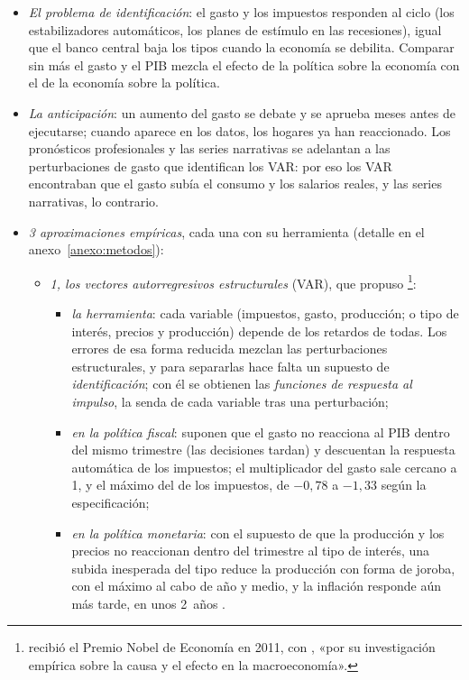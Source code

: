 \documentclass[11pt]{article}
\begin{document}
\begin{itemize}
\item \emph{El problema de identificación}: el gasto y los impuestos responden al ciclo (los estabilizadores automáticos, los planes de estímulo en las recesiones), igual que el banco central baja los tipos cuando la economía se debilita. Comparar sin más el gasto y el PIB mezcla el efecto de la política sobre la economía con el de la economía sobre la política.
\item \emph{La anticipación}: un aumento del gasto se debate y se aprueba meses antes de ejecutarse; cuando aparece en los datos, los hogares ya han reaccionado. Los pronósticos profesionales y las series narrativas se adelantan a las perturbaciones de gasto que identifican los VAR\nocite{Ramey2011Timing}: por eso los VAR encontraban que el gasto subía el consumo y los salarios reales, y las series narrativas, lo contrario.
\item \emph{3 aproximaciones empíricas}, cada una con su herramienta (detalle en el anexo~\ref{anexo:metodos}):
  \begin{itemize}
  \item \emph{1, los vectores autorregresivos estructurales} (VAR), que propuso \textcite{Sims1980Macroeconomics}\footnote{ recibió el Premio Nobel de Economía en 2011, con , «por su investigación empírica sobre la causa y el efecto en la macroeconomía»\nocite{Nobel2011SargentSims}.}:
    \begin{itemize}
    \item \emph{la herramienta}: cada variable (impuestos, gasto, producción; o tipo de interés, precios y producción) depende de los retardos de todas. Los errores de esa forma reducida mezclan las perturbaciones estructurales, y para separarlas hace falta un supuesto de \emph{identificación}; con él se obtienen las \emph{funciones de respuesta al impulso}, la senda de cada variable tras una perturbación;
    \item \emph{en la política fiscal}: \textcite{BlanchardPerotti2002} suponen que el gasto no reacciona al PIB dentro del mismo trimestre (las decisiones tardan) y descuentan la respuesta automática de los impuestos; el multiplicador del gasto sale cercano a 1, y el máximo del de los impuestos, de $-0{,}78$ a $-1{,}33$ según la especificación;
    \item \emph{en la política monetaria}: con el supuesto de que la producción y los precios no reaccionan dentro del trimestre al tipo de interés, una subida inesperada del tipo reduce la producción con forma de joroba, con el máximo al cabo de año y medio, y la inflación responde aún más tarde, en unos 2~años\nocite{ChristianoEichenbaumEvans2005} .

\end{itemize}
\end{itemize}
\end{itemize}
\end{document}
